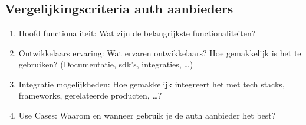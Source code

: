
\chapter{}%
\label{ch:methodologie}



\section{Vergelijkingscriteria \gls{auth} aanbieders}%
\label{sec:vergelijkingscriteria-auth-aanbieders}

\begin{enumerate}
  \item Hoofd functionaliteit: Wat zijn de belangrijkste functionaliteiten?
  \item Ontwikkelaars ervaring: Wat ervaren ontwikkelaars? Hoe gemakkelijk is het te gebruiken? (Documentatie, \gls{sdk}'s, integraties, \ldots)
  \item Integratie mogelijkheden: Hoe gemakkelijk integreert het met tech stacks, frameworks, gerelateerde producten, \ldots?
  \item Use Cases: Waarom en wanneer gebruik je de \gls{auth} aanbieder het best?
\end{enumerate}


